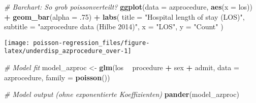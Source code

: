 \documentclass[ngerman,a4paper,]{scrartcl}
\newenvironment{Shaded}{\begin{snugshade}}{\end{snugshade}}
\newcommand{\CommentTok}[1]{\textcolor[rgb]{0.56,0.35,0.01}{\textit{#1}}}
\newcommand{\DataTypeTok}[1]{\textcolor[rgb]{0.13,0.29,0.53}{#1}}
\newcommand{\FloatTok}[1]{\textcolor[rgb]{0.00,0.00,0.81}{#1}}
\newcommand{\KeywordTok}[1]{\textcolor[rgb]{0.13,0.29,0.53}{\textbf{#1}}}
\newcommand{\NormalTok}[1]{#1}
\newcommand{\OperatorTok}[1]{\textcolor[rgb]{0.81,0.36,0.00}{\textbf{#1}}}
\newcommand{\StringTok}[1]{\textcolor[rgb]{0.31,0.60,0.02}{#1}}
\theoremstyle{definition}
\theoremstyle{definition}
\theoremstyle{definition}
\theoremstyle{remark}
\begin{document}
\begin{Shaded}
\begin{Highlighting}[]
\CommentTok{# Barchart: So grob poissonverteilt?}
\KeywordTok{ggplot}\NormalTok{(}\DataTypeTok{data =}\NormalTok{ azprocedure, }\KeywordTok{aes}\NormalTok{(}\DataTypeTok{x =}\NormalTok{ los)) }\OperatorTok{+}
\StringTok{  }\KeywordTok{geom_bar}\NormalTok{(}\DataTypeTok{alpha =} \FloatTok{.75}\NormalTok{) }\OperatorTok{+}
\StringTok{  }\KeywordTok{labs}\NormalTok{(}
    \DataTypeTok{title =} \StringTok{"Hospital length of stay (LOS)"}\NormalTok{,}
    \DataTypeTok{subtitle =} \StringTok{"azprocedure data (Hilbe 2014)"}\NormalTok{,}
    \DataTypeTok{x =} \StringTok{"LOS"}\NormalTok{, }\DataTypeTok{y =} \StringTok{"Count"} 
\NormalTok{  )}
\end{Highlighting}
\end{Shaded}

\begin{center}\texttt{[image: poisson-regression\_files/figure-latex/underdisp\_azprocedure\_over-1]} \end{center}

\begin{Shaded}
\begin{Highlighting}[]
\CommentTok{# Model fit}
\NormalTok{model_azproc <-}\StringTok{ }\KeywordTok{glm}\NormalTok{(los }\OperatorTok{~}\StringTok{ }\NormalTok{procedure }\OperatorTok{+}\StringTok{ }\NormalTok{sex }\OperatorTok{+}\StringTok{ }\NormalTok{admit, }
                    \DataTypeTok{data =}\NormalTok{ azprocedure, }\DataTypeTok{family =} \KeywordTok{poisson}\NormalTok{())}
 
\CommentTok{# Model output (ohne exponentierte Koeffizienten)}
\KeywordTok{pander}\NormalTok{(model_azproc)}
\end{Highlighting}
\end{Shaded}
\end{document}
